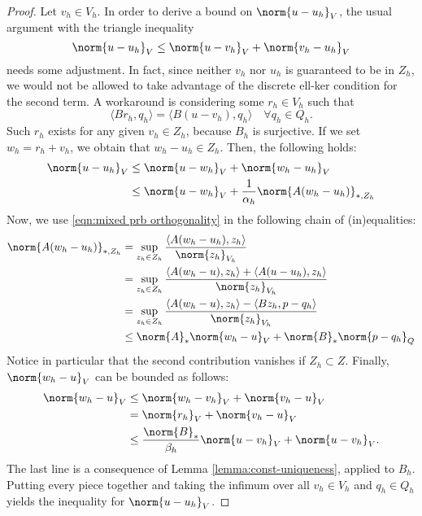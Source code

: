\begin{proof}
	Let $v_h \in V_h$. In order to derive a bound on $\norm{u-u_h}_V$, the usual argument with the triangle inequality
	\[
	\norm{u-u_h}_V\leq\norm{u-v_h}_V+\norm{v_h-u_h}_V
	\]
	needs some adjustment. In fact, since neither $v_h$ nor $u_h$ is guaranteed to be in $Z_h$, we would not be allowed to take advantage of the discrete ell-ker condition for the second term. A workaround is considering some $r_h \in V_h$ such that
	\[
	\langle Br_h , q_h \rangle = \langle B (u-v_h) , q_h \rangle \quad \forall q_h \in Q_h.
	\]
	Such $r_h$ exists for any given $v_h\in Z_h$, because $B_h$ is surjective. If we set $w_h = r_h + v_h$, we obtain that $w_h - u_h \in Z_h$. Then, the following holds:
	\begin{align*}
	    \norm{u-u_h}_V&\leq\norm{u-w_h}_V+\norm{w_h-u_h}_V\\
	    &\leq\norm{u-w_h}_V +\frac{1}{\alpha_h}\norm{A(w_h-u_h)}_{*,Z_h}
	\end{align*}
	Now, we use \eqref{eqn:mixed prb orthogonality} in the following chain of (in)equalities:
	\begin{align*}
	    \norm{A(w_h-u_h)}_{*,Z_h} &= \sup_{z_h\in Z_h}\frac{\langle A(w_h-u_h),z_h\rangle}{\norm{z_h}_{V_h}}\\
	    &= \sup_{z_h\in Z_h}\frac{\langle A(w_h-u),z_h\rangle + \langle A(u-u_h),z_h\rangle}{\norm{z_h}_{V_h}}\\
	    &= \sup_{z_h\in Z_h}\frac{\langle A(w_h-u),z_h\rangle - \langle Bz_h,p-q_h\rangle}{\norm{z_h}_{V_h}}\\
	    &\leq \norm{A}_*\norm{w_h-u}_V+\norm{B}_*\norm{p-q_h}_Q
	\end{align*}
	Notice in particular that the second contribution vanishes if $Z_h \subset Z$. Finally, $\norm{w_h-u}_V$ can be bounded as follows:
	\begin{align}
		\norm{w_h-u}_V &\le \norm{w_h-v_h}_V + \norm{v_h-u}_V \\
		&= \norm{r_h}_V + \norm{v_h-u}_V \\
		&\le \frac{\norm{B}_*}{\beta_h} \norm{u-v_h}_V + \norm{u-v_h}_V.
	\end{align}
	The last line is a consequence of Lemma \ref{lemma:const-uniqueness}, applied to $B_h$. Putting every piece together and taking the infimum over all $v_h \in V_h$ and $q_h \in Q_h$ yields the inequality for $\norm{u-u_h}_V$.
	

\end{proof}
